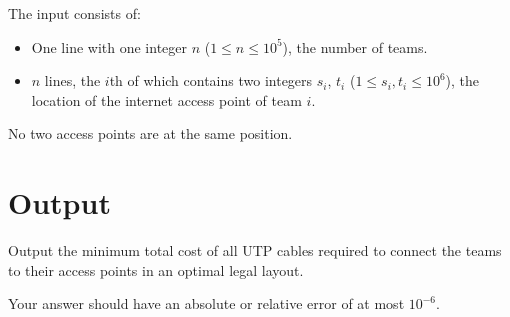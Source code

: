 The input consists of:
\begin{itemize}
	\item One line with one integer $n$ ($1 \le n \le 10^5$), the number of teams.
	\item $n$ lines, the $i$th of which contains two integers $s_i$, $t_i$ ($1 \le s_i,t_i \le 10^6$), the location of the internet access point of team $i$.
\end{itemize}
No two access points are at the same position.

\section*{Output}
Output the minimum total cost of all UTP cables required to connect the teams to their access points in an optimal legal layout.

Your answer should have an absolute or relative error of at most $10^{-6}$.
